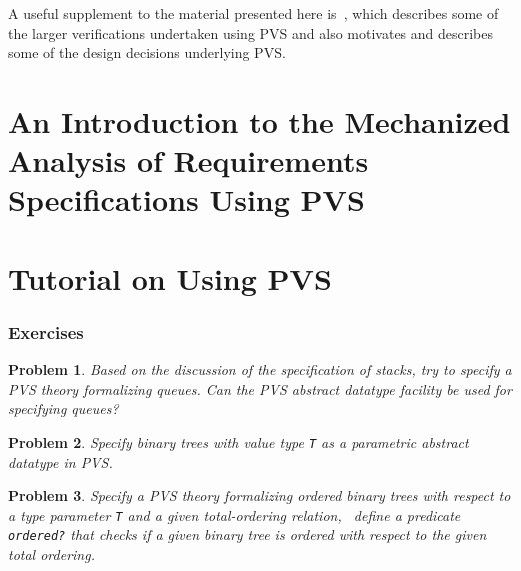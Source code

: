 \documentclass[11pt]{article}
\begin{document}
A useful supplement to the material presented here
is~\cite{Owre95:prolegomena}, which describes some of the larger
verifications undertaken using PVS and also motivates and describes
some of the design decisions underlying PVS.

\newpage
\part[Introduction to Mechanized Analysis of
Specifications Using PVS]{An Introduction to the Mechanized Analysis of
Requirements Specifications Using PVS}
\cleardoublepage
{}

\newpage
\thispagestyle{plain}


\setcounter{section}{0}
\newpage
\part{Tutorial on Using PVS}
\cleardoublepage







\section{Exercises}

\newtheorem{prob}{Problem}

\begin{prob}
Based on the discussion of the specification of stacks, try to specify a
PVS theory formalizing queues.  Can the PVS abstract datatype facility
be used for specifying queues?
\end{prob}

\begin{prob}
Specify binary trees with value type {\tt T} as a parametric abstract
datatype in PVS.
\end{prob}

\begin{prob}
Specify a PVS theory formalizing {\em ordered\/} binary trees with respect to a
type parameter {\tt T} and a given total-ordering relation, \ie\ define
a predicate {\tt ordered?} that checks if a given binary tree is ordered
with respect to the given total ordering.
\end{prob}
\end{document}
